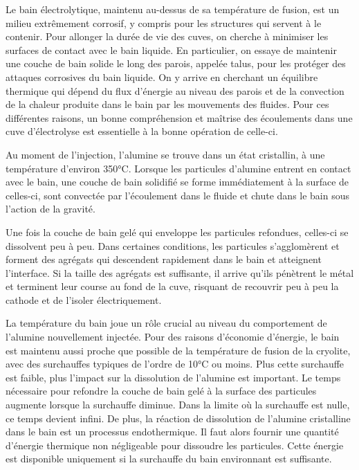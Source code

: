 Le bain électrolytique, maintenu au-dessus de sa température de
fusion, est un milieu extrêmement corrosif, y compris pour les
structures qui servent à le contenir. Pour allonger la durée de vie
des cuves, on cherche à minimiser les surfaces de contact avec le bain
liquide. En particulier, on essaye de maintenir une couche de bain
solide le long des parois, appelée talus, pour les protéger des
attaques corrosives du bain liquide. On y arrive en cherchant un
équilibre thermique qui dépend du flux d'énergie au niveau des parois
et de la convection de la chaleur produite dans le bain par les
mouvements des fluides. Pour ces différentes raisons, un bonne
compréhension et maîtrise des écoulements dans une cuve d'électrolyse
est essentielle à la bonne opération de celle-ci.

Au moment de l'injection, l'alumine se trouve dans un état cristallin,
à une température d'environ \num{350}\si{\celsius}. Lorsque les
particules d'alumine entrent en contact avec le bain, une couche de
bain solidifié se forme immédiatement à la surface de celles-ci,
sont convectée par l'écoulement dans le fluide et chute dans le bain
sous l'action de la gravité.

Une fois la couche de bain gelé qui enveloppe les particules
refondues, celles-ci se dissolvent peu à peu. Dans certaines
conditions, les particules s'agglomèrent et forment des agrégats
qui descendent rapidement dans le bain et atteignent l'interface. Si
la taille des agrégats est suffisante, il arrive qu'ils pénètrent
le métal et terminent leur course au fond de la cuve, risquant de
recouvrir peu à peu la cathode et de l'isoler électriquement.

La température du bain joue un rôle crucial au niveau du comportement
de l'alumine nouvellement injectée. Pour des raisons d'économie
d'énergie, le bain est maintenu aussi proche que possible de la
température de fusion de la cryolite, avec des surchauffes typiques de
l'ordre de \num{10}\si{\celsius} ou moins. Plus cette surchauffe est
faible, plus l'impact sur la dissolution de l'alumine est
important. Le temps nécessaire pour refondre la couche de bain gelé à
la surface des particules augmente lorsque la surchauffe diminue. Dans
la limite où la surchauffe est nulle, ce temps devient infini. De
plus, la réaction de dissolution de l'alumine cristalline dans le bain
est un processus endothermique. Il faut alors fournir une quantité
d'énergie thermique non négligeable pour dissoudre les
particules. Cette énergie est disponible uniquement si la surchauffe
du bain environnant est suffisante.

